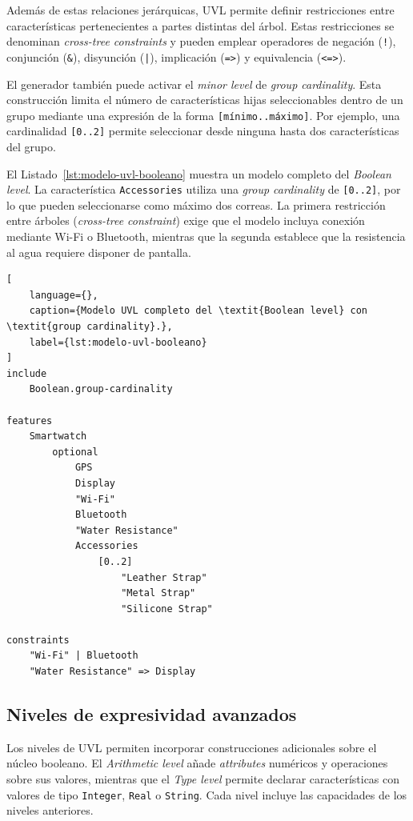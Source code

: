 Además de estas relaciones jerárquicas, UVL permite definir restricciones entre
características pertenecientes a partes distintas del árbol. Estas restricciones
se denominan \textit{cross-tree constraints} y pueden emplear operadores de
negación (\texttt{!}), conjunción (\texttt{\&}), disyunción (\texttt{|}),
implicación (\texttt{=>}) y equivalencia (\texttt{<=>}).

El generador también puede activar el \textit{minor level} de
\textit{group cardinality}. Esta construcción limita el número de
características hijas seleccionables dentro de un grupo mediante una expresión
de la forma \texttt{[mínimo..máximo]}. Por ejemplo, una cardinalidad
\texttt{[0..2]} permite seleccionar desde ninguna hasta dos características
del grupo.

El Listado~\ref{lst:modelo-uvl-booleano} muestra un modelo completo del
\textit{Boolean level}. La característica \texttt{Accessories} utiliza una
\textit{group cardinality} de \texttt{[0..2]}, por lo que pueden seleccionarse
como máximo dos correas. La primera restricción entre árboles (\textit{cross-tree constraint}) exige que
el modelo incluya conexión mediante Wi-Fi o Bluetooth, mientras que la segunda
establece que la resistencia al agua requiere disponer de pantalla.

\begin{lstlisting}[
    language={},
    caption={Modelo UVL completo del \textit{Boolean level} con \textit{group cardinality}.},
    label={lst:modelo-uvl-booleano}
]
include
    Boolean.group-cardinality

features
    Smartwatch
        optional
            GPS
            Display
            "Wi-Fi"
            Bluetooth
            "Water Resistance"
            Accessories
                [0..2]
                    "Leather Strap"
                    "Metal Strap"
                    "Silicone Strap"

constraints
    "Wi-Fi" | Bluetooth
    "Water Resistance" => Display
\end{lstlisting}

\subsection{Niveles de expresividad avanzados}
\label{subsec:niveles_lenguaje}

Los niveles de UVL permiten incorporar construcciones adicionales sobre el
núcleo booleano. El \textit{Arithmetic level} añade \textit{attributes}
numéricos y operaciones sobre sus valores, mientras que el \textit{Type level}
permite declarar características con valores de tipo \texttt{Integer},
\texttt{Real} o \texttt{String}. Cada nivel incluye las capacidades de los
niveles anteriores.

